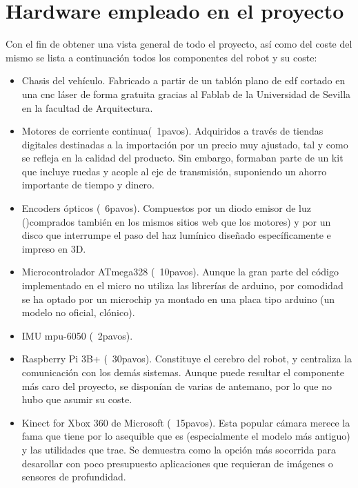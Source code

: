 \section{Hardware empleado en el proyecto}
Con el fin de obtener una vista general de todo el proyecto, así como del coste del mismo se lista a continuación todos los componentes del robot y su coste:
\begin{itemize}
	\item Chasis del vehículo. Fabricado a partir de un tablón plano de edf cortado en una cnc láser de forma gratuita gracias al Fablab de la Universidad de Sevilla en la facultad de Arquitectura.
	\item Motores de corriente continua(~1pavos). Adquiridos a través de tiendas digitales destinadas a la importación por un precio muy ajustado, tal y como se refleja en la calidad del producto. Sin embargo, formaban parte de un kit que incluye ruedas y acople al eje de transmisión, suponiendo un ahorro importante de tiempo y dinero. 
	\item Encoders ópticos (~6pavos). Compuestos por un diodo emisor de luz ()comprados también en los mismos sitios web que los motores) y por un disco que interrumpe el paso del haz lumínico diseñado específicamente e impreso en 3D.
	\item Microcontrolador ATmega328 (~10pavos). Aunque la gran parte del código implementado en el micro no utiliza las librerías de arduino, por comodidad se ha optado por un microchip ya montado en una placa tipo arduino (un modelo no oficial, clónico).
	\item IMU mpu-6050 (~2pavos).
	\item Raspberry Pi 3B+ (~30pavos). Constituye el cerebro del robot, y centraliza la comunicación con los demás sistemas. Aunque puede resultar el componente más caro del proyecto, se disponían de varias de antemano, por lo que no hubo que asumir su coste.
	\item Kinect for Xbox 360 de Microsoft (~15pavos). Esta popular cámara merece la fama que tiene por lo asequible que es (especialmente el modelo más antiguo) y las utilidades que trae. Se demuestra como la opción más socorrida para desarollar con poco presupuesto aplicaciones que requieran de imágenes o sensores de profundidad.
	
\end{itemize}

